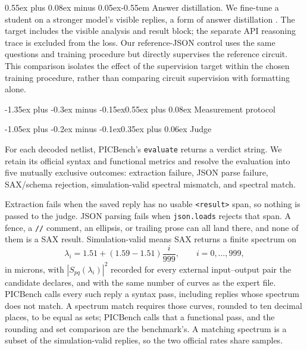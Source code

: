 \documentclass[11pt]{article}
\makeatletter
\renewcommand\section{\@startsection{section}{1}{\z@}%
  {-1.35ex plus -0.3ex minus -0.15ex}{0.55ex plus 0.08ex}%
  {\normalfont\large\bfseries}}
\renewcommand\subsection{\@startsection{subsection}{2}{\z@}%
  {-1.05ex plus -0.2ex minus -0.1ex}{0.35ex plus 0.06ex}%
  {\normalfont\normalsize\bfseries}}
\renewcommand\paragraph{\@startsection{paragraph}{4}{\z@}%
  {0.55ex plus 0.08ex minus 0.05ex}{-0.55em}%
  {\normalfont\normalsize\bfseries}}
\makeatother
\begin{document}
\paragraph{Answer distillation.}
We fine-tune a student on a stronger model's visible replies, a form of answer distillation \citep{hinton2015distilling}. The target includes the visible analysis and result block; the separate API reasoning trace is excluded from the loss. Our reference-JSON control uses the same questions and training procedure but directly supervises the reference circuit. This comparison isolates the effect of the supervision target within the chosen training procedure, rather than comparing circuit supervision with formatting alone.

\section{Measurement protocol}
\label{sec:protocol}

\subsection{Judge}

For each decoded netlist, PICBench's \texttt{evaluate} returns a verdict string. We retain its official syntax and functional metrics and resolve the evaluation into five mutually exclusive outcomes: extraction failure, JSON parse failure, SAX/schema rejection, simulation-valid spectral mismatch, and spectral match.

Extraction fails when the saved reply has no usable \texttt{\textless result\textgreater} span, so nothing is passed to the judge.
JSON parsing fails when \texttt{json.loads} rejects that span.
A fence, a \texttt{//} comment, an ellipsis, or trailing prose can all land there, and none of them is a SAX result.
Simulation-valid means SAX returns a finite spectrum on
\[
\lambda_i = 1.51 + (1.59-1.51)\frac{i}{999}, \qquad i=0,\ldots,999,
\]
in microns, with $|S_{pq}(\lambda_i)|^2$ recorded for every external input--output pair the candidate declares, and with the same number of curves as the expert file.
PICBench calls every such reply a syntax pass, including replies whose spectrum does not match.
A spectrum match requires those curves, rounded to ten decimal places, to be equal as sets; PICBench calls that a functional pass, and the rounding and set comparison are the benchmark's.
A matching spectrum is a subset of the simulation-valid replies, so the two official rates share samples.
\end{document}
